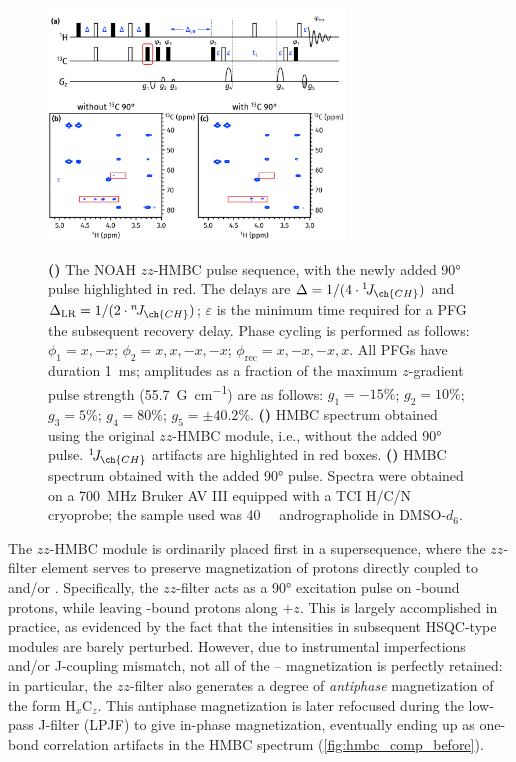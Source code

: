 \documentclass[a4paper,11pt]{article}
\newcommand{\proton}{\ch{^{1}H}}
\newcommand{\carbonbulk}{\ch{^{12}C}}
\newcommand{\carbon}{\ch{^{13}C}}
\newcommand{\nitrogen}{\ch{^{15}N}}
\newcommand{\onejch}{{}^1\!J_{\ch{CH}}}
\newcommand{\njch}{{}^n\!J_{\ch{CH}}}
\newcommand*{\andro}{Spectra were obtained on a \SI{700}{\MHz} Bruker AV III equipped with a TCI H/C/N cryoprobe; the sample used was \SI{40}{\milli\molar} andrographolide in DMSO-\(d_6\).}
\begin{document}
\begin{refsection}
\begin{figure}[ht]
    \centering
    \includegraphics[width=0.7\textwidth]{hmbc_comp.png}
    {\label{fig:hmbc_comp_pulprog}}
    {\label{fig:hmbc_comp_before}}
    {\label{fig:hmbc_comp_after}}
    \caption{
        \textbf{()} The NOAH \(zz\)-HMBC pulse sequence, with the newly added \carbon{} \ang{90} pulse highlighted in red.
        The delays are \(\Delta = 1/(4 \cdot \onejch)\) and \(\Delta_{\text{LR}} = 1/(2 \cdot \njch)\); \(\varepsilon\) is the minimum time required for a PFG the subsequent recovery delay.
        Phase cycling is performed as follows: \(\phi_1 = x, -x\); \(\phi_2 = x, x, -x, -x\); \(\phi_{\text{rec}} = x, -x, -x, x\).
        All PFGs have duration \SI{1}{ms}; amplitudes as a fraction of the maximum \(z\)-gradient pulse strength (\SI{55.7}{G\per\cm}) are as follows: \(g_1 = -15\%\); \(g_2 = 10\%\); \(g_3 = 5\%\); \(g_4 = 80\%\); \(g_5 = \pm 40.2\%\).
        \textbf{()} HMBC spectrum obtained using the original \(zz\)-HMBC module, i.e., without the added \ang{90} pulse.
        \(\onejch{}\) artifacts are highlighted in red boxes.
        \textbf{()} HMBC spectrum obtained with the added \ang{90} pulse.
        \andro{}
    }
    \label{fig:hmbc_comp}
\end{figure}

The \(zz\)-HMBC module is ordinarily placed first in a supersequence, where the \(zz\)-filter element serves to preserve magnetization of protons directly coupled to \carbon{} and/or \nitrogen{}.\autocite{Kupce2018CC,Kupce2019JMR}
Specifically, the \(zz\)-filter acts as a \ang{90} excitation pulse on \carbonbulk{}-bound protons, while leaving \carbon{}-bound protons along \(+z\).
This is largely accomplished in practice, as evidenced by the fact that the intensities in subsequent HSQC-type modules are barely perturbed.
However, due to instrumental imperfections and/or J-coupling mismatch, not all of the \carbon{}--\proton{} magnetization is perfectly retained: in particular, the \(zz\)-filter also generates a degree of \textit{antiphase} magnetization of the form \(\mathrm{H}_x\mathrm{C}_z\).
This antiphase magnetization is later refocused during the low-pass J-filter (LPJF) to give in-phase magnetization, eventually ending up as one-bond correlation artifacts in the HMBC spectrum (\cref{fig:hmbc_comp_before}).


\end{refsection}
\end{document}
